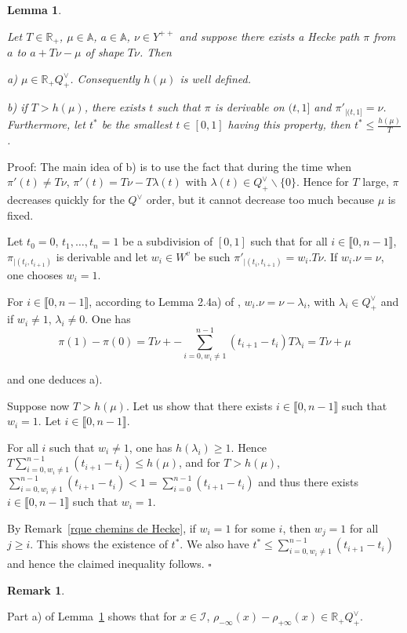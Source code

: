 \documentclass[12pt]{article}
\theoremstyle{plain}
\newtheorem{lemme}[thm]{Lemma}
\theoremstyle{definition}
\newtheorem{rque}[thm]{Remark}
\newcommand{\A}{\mathbb{A}}
\begin{document}
\begin{lemme}\label{lemme fin des chemins de Hecke longs}


Let $T\in \mathbb{R}_+$, $\mu\in \A$,  $a\in \mathbb{A}$, $\nu\in Y^{++}$ and suppose there exists a Hecke path $\pi$ from $a$ to $a+T\nu-\mu$ of shape $T\nu$. Then 

a) $\mu\in \mathbb{R}_+ Q^\vee_+$. Consequently $h(\mu)$ is well defined.

b) if $T>h(\mu)$, there exists $t$ such that $\pi$ is derivable on $(t,1]$ and $\pi'_{|(t,1]}=\nu$. Furthermore, let $t^*$ be the smallest $t \in [0,1]$ having this property, then $t^*\leq \frac{h(\mu)}{T}$.
\end{lemme}


Proof: The main idea of b) is to use the fact that during the time when $\pi'(t)\neq T\nu$, $\pi'(t)=T\nu-T\lambda(t)$ with $\lambda(t)\in Q^\vee_+\backslash \{0\}$. Hence for $T$ large, $\pi$ decreases quickly for the $Q^\vee$ order, but it cannot decrease too much because $\mu$ is fixed.

Let $t_0=0$, $t_1, \ldots,t_n=1$ be a subdivision of $[0,1]$ such that for all $i\in \llbracket 0,n-1\rrbracket $, $\pi_{|(t_i,t_{i+1})}$ is derivable and let $w_i\in W^v$ be such $\pi'_{|(t_i,t_{i+1})}=w_i.T\nu$. If $w_i.\nu=\nu$, one chooses $w_i=1$.

For $i\in \llbracket 0,n-1\rrbracket$, according to Lemma 2.4a) of \cite{gaussent2014spherical}, $w_i.\nu =\nu -\lambda_i$, with $\lambda_i \in Q^\vee_+$ and if $w_i\neq 1$, $\lambda_i\neq 0$. One has \[\pi(1)-\pi(0)=T\nu+-\sum_{i=0, w_i\neq 1}^{n-1}(t_{i+1}-t_i)T\lambda_i=T\nu +\mu\]

and one deduces a).


Suppose now $T>h(\mu)$. Let us show that there exists $i\in \llbracket 0,n-1\rrbracket$ such that $w_i=1$. Let $i\in \llbracket 0,n-1\rrbracket$. 

For all $i$ such that $w_i\neq 1$, one has $h(\lambda_i)\geq 1$. Hence $T\sum_{i=0, w_i\neq 1}^{n-1}(t_{i+1}-t_i)\leq h(\mu)$, and for $T>h(\mu)$, $\sum_{i=0, w_i\neq 1}^{n-1}(t_{i+1}-t_i)<1=\sum_{i=0}^{n-1}(t_{i+1}-t_i)$ and thus there exists $i\in \llbracket 0,n-1\rrbracket$ such that $w_i=1$.

By Remark~\ref{rque chemins de Hecke}, if $w_i=1$ for some $i$, then $w_j=1$ for all $j\geq i$. This shows the existence of $t^*$. We also have $t^*\leq \sum_{i=0, w_i\neq 1}^{n-1}(t_{i+1}-t_i)$ and hence the claimed inequality follows. $\square$


\begin{rque}\label{rque condition sur mu}

 Part a) of Lemma~\ref{lemme fin des chemins de Hecke longs} shows that for $x\in \mathcal{I}$, $\rho_{-\infty}(x)-\rho_{+\infty}(x)\in \mathbb{R}_+Q^\vee_+$.
\end{rque}
\end{document}
